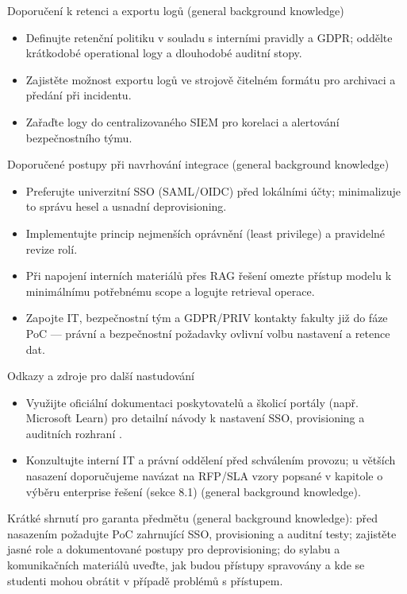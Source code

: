 Doporučení k retenci a exportu logů (general background knowledge)
\begin{itemize}
  \item Definujte retenční politiku v souladu s interními pravidly a GDPR; oddělte krátkodobé operational logy a dlouhodobé auditní stopy.
  \item Zajistěte možnost exportu logů ve strojově čitelném formátu pro archivaci a předání při incidentu.
  \item Zařaďte logy do centralizovaného SIEM pro korelaci a alertování bezpečnostního týmu.
\end{itemize}

Doporučené postupy při navrhování integrace (general background knowledge)
\begin{itemize}
  \item Preferujte univerzitní SSO (SAML/OIDC) před lokálními účty; minimalizuje to správu hesel a usnadní deprovisioning.
  \item Implementujte princip nejmenších oprávnění (least privilege) a pravidelné revize rolí.
  \item Při napojení interních materiálů přes RAG řešení omezte přístup modelu k minimálnímu potřebnému scope a logujte retrieval operace.
  \item Zapojte IT, bezpečnostní tým a GDPR/PRIV kontakty fakulty již do fáze PoC — právní a bezpečnostní požadavky ovlivní volbu nastavení a retence dat.
\end{itemize}

Odkazy a zdroje pro další nastudování
\begin{itemize}
  \item Využijte oficiální dokumentaci poskytovatelů a školicí portály (např. Microsoft Learn) pro detailní návody k nastavení SSO, provisioning a auditních rozhraní \cite{kb_ai_101_tipu_pdf_04e4a115_page_54_1}.
  \item Konzultujte interní IT a právní oddělení před schválením provozu; u větších nasazení doporučujeme navázat na RFP/SLA vzory popsané v kapitole o výběru enterprise řešení (sekce 8.1) (general background knowledge).
\end{itemize}

Krátké shrnutí pro garanta předmětu (general background knowledge): před nasazením požadujte PoC zahrnující SSO, provisioning a auditní testy; zajistěte jasné role a dokumentované postupy pro deprovisioning; do sylabu a komunikačních materiálů uveďte, jak budou přístupy spravovány a kde se studenti mohou obrátit v případě problémů s přístupem.
